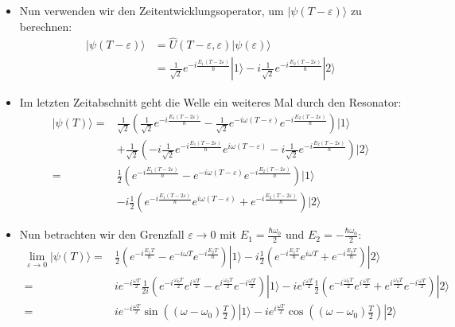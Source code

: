 \documentclass[11pt, ngerman, fleqn, DIV=15, headinclude]{scrartcl}
\begin{document}
\begin{itemize}
	\item  Nun verwenden wir den Zeitentwicklungsoperator, um $|\psi(T-\varepsilon)\rangle$ zu berechnen:
		\begin{align*}
			|\psi(T-\varepsilon)\rangle&= \hat{U}(T-\varepsilon,\varepsilon)|\psi(\varepsilon)\rangle \\
				&= \frac{1}{\sqrt{2}}e^{-i\frac{E_1(T-2\varepsilon)}{\hbar}}|1\rangle-i\frac{1}{\sqrt{2}}e^{-i\frac{E_2(T-2\varepsilon)}{\hbar}}|2\rangle
		\end{align*}
	\item Im letzten Zeitabschnitt geht die Welle ein weiteres Mal durch den Resonator:
		\begin{align*}
			|\psi(T)\rangle=&\frac{1}{\sqrt{2}}(\frac{1}{\sqrt{2}}e^{-i\frac{E_1(T-2\varepsilon)}{\hbar}} - \frac{1}{\sqrt{2}} e^{-i\omega (T-\varepsilon)}e^{-i\frac{E_2(T-2\varepsilon)}{\hbar}})|1\rangle  \\
			&+ \frac{1}{\sqrt{2}} (-i\frac{1}{\sqrt{2}}e^{-i\frac{E_1(T-2\varepsilon)}{\hbar}}e^{i\omega(T-\varepsilon)}-i\frac{1}{\sqrt{2}}e^{-i\frac{E_2(T-2\varepsilon)}{\hbar}})|2\rangle \\
			=&\frac{1}{2}(e^{-i\frac{E_1(T-2\varepsilon)}{\hbar}} -  e^{-i\omega (T-\varepsilon)}e^{-i\frac{E_2(T-2\varepsilon)}{\hbar}})|1\rangle \\
			&-i\frac{1}{2}(e^{-i\frac{E_1(T-2\varepsilon)}{\hbar}}e^{i\omega(T-\varepsilon)}+e^{-i\frac{E_2(T-2\varepsilon)}{\hbar}})|2\rangle
		\end{align*}
	\item Nun betrachten wir den Grenzfall $\varepsilon \rightarrow 0$ mit $E_1=\frac{\hbar\omega_0}{2}$ und $E_2=-\frac{\hbar\omega_0}{2}$:
		\begin{align*}
			\lim_{\varepsilon\rightarrow 0}|\psi(T)\rangle=&
				\frac{1}{2}(e^{-i\frac{E_1T}{\hbar}} -  e^{-i\omega T}e^{-i\frac{E_2T}{\hbar}})|1\rangle 
			-i\frac{1}{2}(e^{-i\frac{E_1T}{\hbar}}e^{i\omega T}+e^{-i\frac{E_2T}{\hbar}})|2\rangle \\
			=& i e^{-i\frac{\omega T}{2}} \frac{1}{2i} (e^{-i\frac{\omega_0T}{2}}e^{i\frac{\omega T}{2}}-e^{i\frac{\omega_0T}{2}}e^{-i\frac{\omega T}{2}})|1\rangle 
			-ie^{i\frac{\omega T}{2}} \frac{1}{2}(e^{-i\frac{\omega_0T}{2}}e^{i\frac{\omega T}{2}}+e^{i\frac{\omega_0T}{2}}e^{-i\frac{\omega T}{2}})|2\rangle \\
			=& i e^{-i\frac{\omega T}{2}} \sin((\omega-\omega_0)\frac{T}{2})|1\rangle 
			-ie^{i\frac{\omega T}{2}} \cos((\omega-\omega_0)\frac{T}{2})|2\rangle
		\end{align*}

	\end{itemize}
\end{document}
